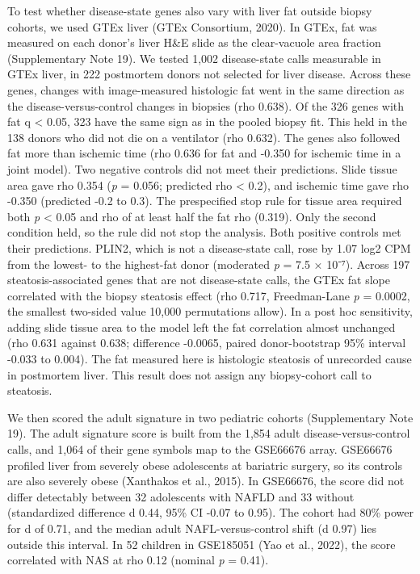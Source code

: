 To test whether disease-state genes also vary with liver fat outside biopsy cohorts, we used GTEx liver (GTEx Consortium, 2020). In GTEx, fat was measured on each donor's liver H\&E slide as the clear-vacuole area fraction (Supplementary Note 19). We tested 1,002 disease-state calls measurable in GTEx liver, in 222 postmortem donors not selected for liver disease. Across these genes, changes with image-measured histologic fat went in the same direction as the disease-versus-control changes in biopsies (rho 0.638). Of the 326 genes with fat q \textless{} 0.05, 323 have the same sign as in the pooled biopsy fit. This held in the 138 donors who did not die on a ventilator (rho 0.632). The genes also followed fat more than ischemic time (rho 0.636 for fat and -0.350 for ischemic time in a joint model). Two negative controls did not meet their predictions. Slide tissue area gave rho 0.354 (\emph{p} = 0.056; predicted \textbar rho\textbar{} \textless{} 0.2), and ischemic time gave rho -0.350 (predicted -0.2 to 0.3). The prespecified stop rule for tissue area required both \emph{p} \textless{} 0.05 and \textbar rho\textbar{} of at least half the fat rho (0.319). Only the second condition held, so the rule did not stop the analysis. Both positive controls met their predictions. PLIN2, which is not a disease-state call, rose by 1.07 log2 CPM from the lowest- to the highest-fat donor (moderated \emph{p} = 7.5 × 10⁻⁷). Across 197 steatosis-associated genes that are not disease-state calls, the GTEx fat slope correlated with the biopsy steatosis effect (rho 0.717, Freedman-Lane \emph{p} = 0.0002, the smallest two-sided value 10,000 permutations allow). In a post hoc sensitivity, adding slide tissue area to the model left the fat correlation almost unchanged (rho 0.631 against 0.638; difference -0.0065, paired donor-bootstrap 95\% interval -0.033 to 0.004). The fat measured here is histologic steatosis of unrecorded cause in postmortem liver. This result does not assign any biopsy-cohort call to steatosis.

We then scored the adult signature in two pediatric cohorts (Supplementary Note 19). The adult signature score is built from the 1,854 adult disease-versus-control calls, and 1,064 of their gene symbols map to the GSE66676 array. GSE66676 profiled liver from severely obese adolescents at bariatric surgery, so its controls are also severely obese (Xanthakos et al., 2015). In GSE66676, the score did not differ detectably between 32 adolescents with NAFLD and 33 without (standardized difference d 0.44, 95\% CI -0.07 to 0.95). The cohort had 80\% power for d of 0.71, and the median adult NAFL-versus-control shift (d 0.97) lies outside this interval. In 52 children in GSE185051 (Yao et al., 2022), the score correlated with NAS at rho 0.12 (nominal \emph{p} = 0.41).


